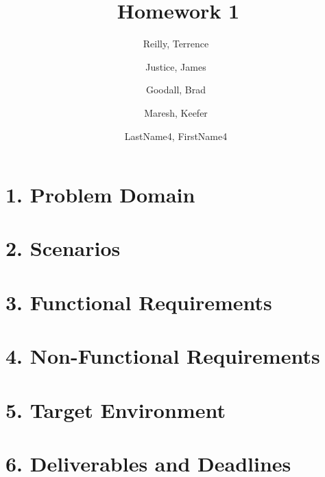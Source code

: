 \documentclass[a4paper,12pt]{article}
\author{
    Reilly, Terrence\
    \and
    Justice, James\
    \and
    Goodall, Brad\
    \and
    Maresh, Keefer\
    \and
    LastName4, FirstName4\
}
\title{Homework 1}
\begin{document}
    \maketitle

    \section*{1. Problem Domain}
        

    \section*{2. Scenarios}
        

    \section*{3. Functional Requirements}
        

    \section*{4. Non-Functional Requirements}
        

    \section*{5. Target Environment}
        

    \section*{6. Deliverables and Deadlines}
        
\end{document}
